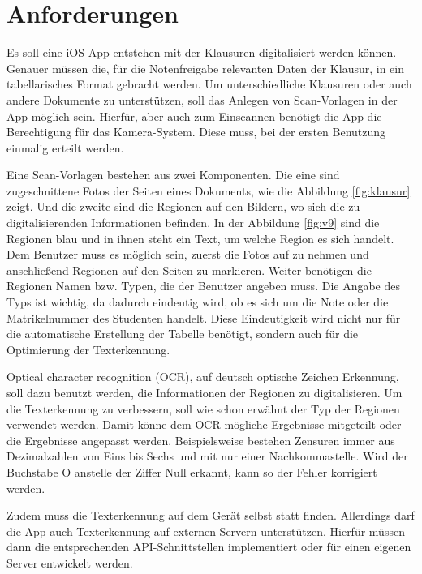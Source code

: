 \documentclass[nomenclature, oneside, 150]{HSMW-Thesis}
\begin{document}
\chapter{Anforderungen}\label{ch:anforderungen}
	Es soll eine iOS-App entstehen mit der Klausuren digitalisiert werden können. Genauer müssen die, für die Notenfreigabe relevanten Daten der Klausur, in ein tabellarisches Format gebracht werden. Um unterschiedliche Klausuren oder auch andere Dokumente zu unterstützen, soll das Anlegen von Scan-Vorlagen in der App möglich sein. Hierfür, aber auch zum Einscannen benötigt die App die Berechtigung für das Kamera-System. Diese muss, bei der ersten Benutzung einmalig erteilt werden.
	
	Eine Scan-Vorlagen bestehen aus zwei Komponenten. Die eine sind zugeschnittene Fotos der Seiten eines Dokuments, wie die Abbildung \ref{fig:klausur} zeigt. Und die zweite sind die Regionen auf den Bildern, wo sich die zu digitalisierenden Informationen befinden. In der Abbildung \ref{fig:v9} sind die Regionen blau und in ihnen steht ein Text, um welche Region es sich handelt. Dem Benutzer muss es möglich sein, zuerst die Fotos auf zu nehmen und anschließend Regionen auf den Seiten zu markieren. Weiter benötigen die Regionen Namen bzw. Typen, die der Benutzer angeben muss. Die Angabe des Typs ist wichtig, da dadurch eindeutig wird, ob es sich um die Note oder die Matrikelnummer des Studenten handelt. Diese Eindeutigkeit wird nicht nur für die automatische Erstellung der Tabelle benötigt, sondern auch für die Optimierung der Texterkennung. 
	
	Optical character recognition (OCR), auf deutsch optische Zeichen Erkennung, soll dazu benutzt werden, die Informationen der Regionen zu digitalisieren. Um die Texterkennung zu verbessern, soll wie schon erwähnt der Typ der Regionen verwendet werden. Damit könne dem OCR mögliche Ergebnisse mitgeteilt oder die Ergebnisse angepasst werden. Beispielsweise bestehen Zensuren immer aus Dezimalzahlen von Eins bis Sechs und mit nur einer Nachkommastelle. Wird der Buchstabe O anstelle der Ziffer Null erkannt, kann so der Fehler korrigiert werden. 
	
	Zudem muss die Texterkennung auf dem Gerät selbst statt finden. Allerdings darf die App auch Texterkennung auf externen Servern unterstützen. Hierfür müssen dann die entsprechenden API-Schnittstellen implementiert oder für einen eigenen Server entwickelt werden.
\end{document}
